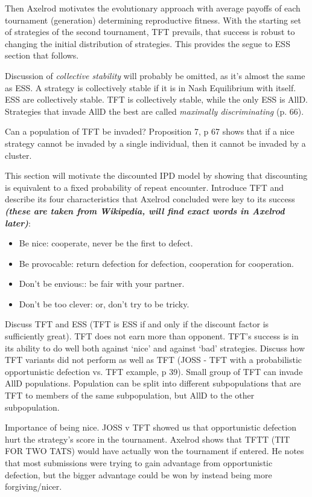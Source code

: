 Then Axelrod motivates the evolutionary approach with average payoffs of each tournament (generation) determining reproductive fitness. With the starting set of strategies of the second tournament, TFT prevails, that success is robust to changing the initial distribution of strategies. This provides the segue to ESS section that follows.

Discussion of \textit{collective stability} will probably be omitted, as it's almost the same as ESS. A strategy is collectively stable if it is in Nash Equilibrium with itself. ESS are collectively stable. TFT is collectively stable, while the only ESS is AllD. Strategies that invade AllD the best are called \textit{maximally discriminating} (p. 66).

Can a population of TFT be invaded? Proposition 7, p 67 shows that if a nice strategy cannot be invaded by a single individual, then it cannot be invaded by a cluster. 

This section will motivate the discounted IPD model by showing that discounting is equivalent to a fixed probability of repeat encounter. Introduce TFT and describe its four characteristics that Axelrod concluded were key to its success \textit{\textbf{(these are taken from Wikipedia, will find exact words in Axelrod later)}}:
\begin{itemize}
\item Be nice: cooperate, never be the first to defect.
\item Be provocable: return defection for defection, cooperation for cooperation.
\item Don't be envious:: be fair with your partner.
\item Don't be too clever: or, don't try to be tricky.
\end{itemize}
Discuss TFT and ESS (TFT is ESS if and only if the discount factor is sufficiently great). TFT does not earn more than opponent. TFT's success is in its ability to do well both against `nice' and against `bad' strategies. Discuss how TFT variants did not perform as well as TFT (JOSS - TFT with a probabilistic opportunistic defection vs. TFT example, p 39). Small group of TFT can invade AllD populations. Population can be split into different subpopulations that are TFT to members of the same subpopulation, but AllD to the other subpopulation.

Importance of being nice. JOSS v TFT showed us that opportunistic defection hurt the strategy's score in the tournament. Axelrod shows that TFTT (TIT FOR TWO TATS) would have actually won the tournament if entered. He notes that most submissions were trying to gain advantage from opportunistic defection, but the bigger advantage could be won by instead being more forgiving/nicer.


